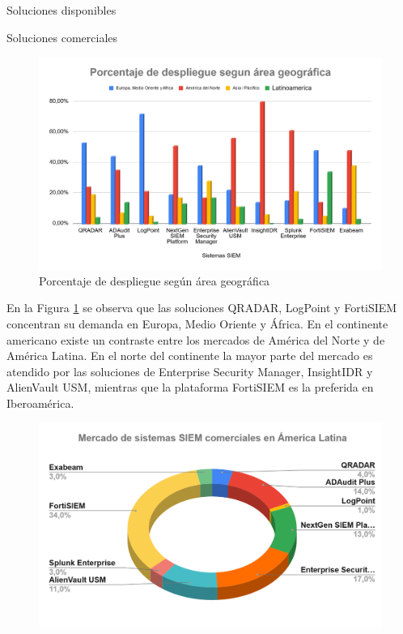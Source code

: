 \begin{section}{Soluciones disponibles}
\begin{subsection}{Soluciones comerciales}
        \begin{figure}[H]
            \centering
            \includegraphics[width=1\textwidth]{./marco_teorico_imagenes/figura_11_porcentaje_area_geografica.png}
            \caption{Porcentaje de despliegue según área geográfica}
            \label{fig:area_geografica_mundial}
        \end{figure}
        \FloatBarrier
        \vspace{-0,5cm}
        En la Figura \ref{fig:area_geografica_mundial} se observa que las soluciones QRADAR\cite{qradar}, LogPoint\cite{logpoint} y FortiSIEM\cite{fortisiem} concentran su demanda en Europa, Medio Oriente y África. En el continente americano existe un contraste entre los mercados de América del Norte y de América Latina. En el norte del continente la mayor parte del mercado es atendido por las soluciones de Enterprise Security Manager\cite{enterprise}, InsightIDR\cite{insight} y AlienVault USM\cite{alienvault_usm}, mientras que la plataforma FortiSIEM es la preferida en Iberoamérica. \par
        \begin{figure}[H]
            \centering
            \includegraphics[width=1\textwidth]{./marco_teorico_imagenes/figura_12_comercial_america_latina.png}

\end{figure}
\end{subsection}
\end{section}
